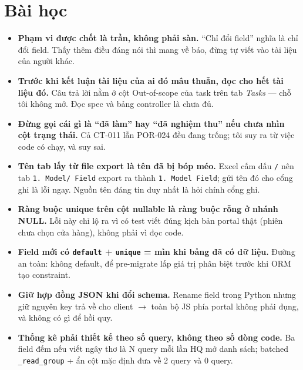 \section{Bài học}

\begin{itemize}
  \item \textbf{Phạm vi được chốt là trần, không phải sàn.} ``Chỉ đổi field'' nghĩa là chỉ đổi
    field. Thấy thêm điều đáng nói thì mang về báo, đừng tự viết vào tài liệu của người khác.
  \item \textbf{Trước khi kết luận tài liệu của ai đó mâu thuẫn, đọc cho hết tài liệu đó.} Câu trả
    lời nằm ở cột Out-of-scope của task trên tab \emph{Tasks} --- chỗ tôi không mở. Đọc spec và bảng
    controller là chưa đủ.
  \item \textbf{Đừng gọi cái gì là ``đã làm'' hay ``đã nghiệm thu'' nếu chưa nhìn cột trạng thái.}
    Cả CT-011 lẫn POR-024 đều đang trống; tôi suy ra từ việc code có chạy, và suy sai.
  \item \textbf{Tên tab lấy từ file export là tên đã bị bóp méo.} Excel cấm dấu \texttt{/} nên tab
    \texttt{1. Model/ Field} export ra thành \texttt{1. Model Field}; gửi tên đó cho cổng ghi là lỗi
    ngay. Nguồn tên đáng tin duy nhất là hỏi chính cổng ghi.
  \item \textbf{Ràng buộc unique trên cột nullable là ràng buộc rỗng ở nhánh NULL.} Lỗi này chỉ lộ
    ra vì có test viết đúng kịch bản portal thật (phiên chưa chọn cửa hàng), không phải vì đọc code.
  \item \textbf{Field mới có \texttt{default} + \texttt{unique} = mìn khi bảng đã có dữ liệu.}
    Đường an toàn: không default, để pre-migrate lấp giá trị phân biệt trước khi ORM tạo constraint.
  \item \textbf{Giữ hợp đồng JSON khi đổi schema.} Rename field trong Python nhưng giữ nguyên key
    trả về cho client $\to$ toàn bộ JS phía portal không phải đụng, và không có gì để hồi quy.
  \item \textbf{Thống kê phải thiết kế theo số query, không theo số dòng code.} Ba field đếm nếu
    viết ngây thơ là N query mỗi lần HQ mở danh sách; batched \texttt{\_read\_group} + ẩn cột mặc
    định đưa về 2 query và 0 query.
\end{itemize}
